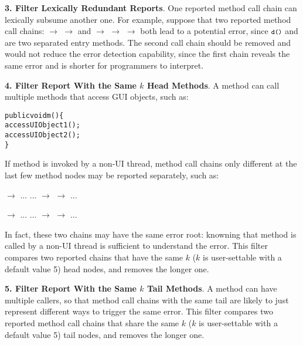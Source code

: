 \textbf{3. Filter Lexically Redundant Reports}. One reported method call
chain can lexically subsume another one. For example, suppose that two
reported method call chains:  $\rightarrow$ 
$\rightarrow$  and 
 $\rightarrow$  $\rightarrow$  $\rightarrow$ 
both lead to a potential error, since $\CodeIn{d()}$ and 
are two separated entry methods. The second call chain should
be removed and would not reduce the error detection capability, since
the first chain reveals the same error and is shorter 
for programmers to interpret.


\textbf{4. Filter Report With the Same $k$ Head Methods}. A method can call
multiple methods that access GUI objects, such as:
\begin{CodeOut}
\begin{alltt}
     public void m() \{
         accessUIObject1();
         accessUIObject2();
     \}
\end{alltt}
\end{CodeOut}
If method  is invoked by a non-UI thread, method call chains
only different at the last few method nodes may be reported separately, such as:

 $\rightarrow$ ... ... $\rightarrow$  $\rightarrow$  ...

 $\rightarrow$ ... ... $\rightarrow$  $\rightarrow$  ...

In fact, these two chains may have the same error root: knowning that
method  is called by a non-UI thread is sufficient to understand
the error.
This filter compares two reported chains that have the same
$k$ ($k$ is user-settable with a default value 5) head nodes, and removes the longer one.

\textbf{5. Filter Report With the Same $k$ Tail Methods}. A method
can have multiple callers, so that method call chains with the same tail are likely
to just represent different ways to trigger the same error. This filter compares 
two reported method call chains that share the same 
$k$ ($k$ is user-settable with a default value 5) tail nodes, and removes the longer one.


\vspace{1mm}

